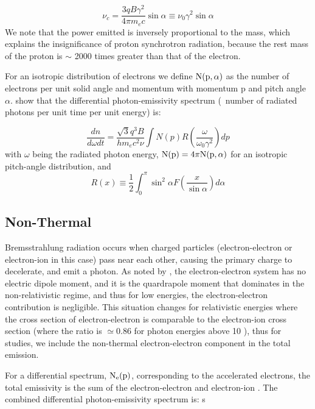 \begin{equation}\label{eq:nuCrit}
\nu_c = \frac{3q B \gamma^2}{4\pi m_e c} 
\sin\alpha \equiv \nu_0 \gamma^2 \sin\alpha
\end{equation}
We note that the power emitted is inversely proportional to the mass, which explains the insignificance of proton synchrotron radiation, because the rest mass of the proton is $\sim$ 2000 times greater than that of the electron.

For an isotropic distribution of electrons we define  ${\rm N(p,\alpha)}$ as the number of electrons per unit solid angle and momentum with momentum p and pitch angle $\alpha$. \cite{Houck06} show that the differential photon-emissivity spectrum (\ie{}\ number of radiated photons per unit time per unit energy) is:

\begin{equation}
\frac{d n}{d \omega d t} =
\frac{\sqrt{3}q^3 B}{h m_e c^2 \nu}
\int
N(p)
R \left(\frac{\omega}{\omega_0 \gamma^2}\right)dp
\end{equation}
with $\omega$ being the radiated photon energy, ${\rm N(p) = 4\pi N(p,\alpha)}$ for an isotropic pitch-angle distribution, and
\begin{equation}
R(x) \equiv \frac{1}{2} \int_0^\pi
\sin^2 \alpha
F\left(\frac{x}{\sin\alpha}\right) d \alpha 
\end{equation}


\subsection{Non-Thermal \brems{}}\label{gamAstr:bremss}
Bremsstrahlung radiation occurs when charged particles (electron-electron or electron-ion in this case) pass near each other, causing the  primary charge to decelerate, and emit a photon. As noted by \cite{Haug75}, the electron-electron \brems{} system has no electric dipole moment, and it is the quardrapole moment that dominates in the non-relativistic regime, and thus for low energies, the electron-electron contribution is negligible. This situation changes for relativistic energies where the cross section of electron-electron \brems{} is comparable to the electron-ion cross section (where the ratio is $\simeq 0.86$ for photon energies above 10\mev{} \citep{Baring99}), thus for \gam{} studies, we include the non-thermal electron-electron component in the total \brems{} emission.

For a differential spectrum, ${\rm N_e(p)}$, corresponding to the accelerated electrons, the total emissivity is  the sum of the electron-electron and electron-ion \brems{}. The combined differential photon-emissivity spectrum is: s

